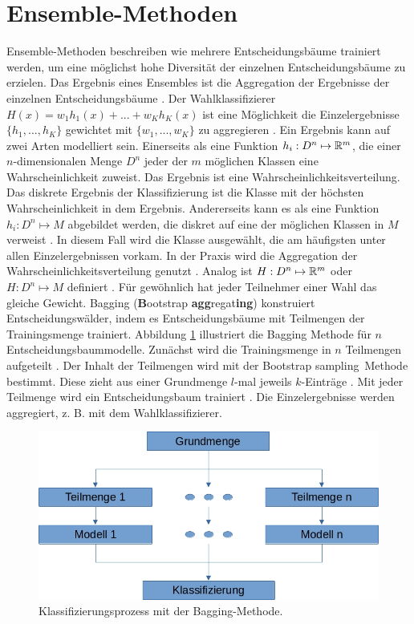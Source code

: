 \section{Ensemble-Methoden}
\label{sec:dt_ensemble_methods}
Ensemble-Methoden beschreiben wie mehrere Entscheidungsbäume trainiert werden, um eine möglichst hohe Diversität der einzelnen Entscheidungsbäume zu erzielen. Das Ergebnis eines Ensembles
ist die Aggregation der Ergebnisse der einzelnen Entscheidungsbäume \cite{dietterich2002ensemble}.
\newline
\newline
Der Wahlklassifizierer $H(x) = w_1 h_1(x) + ... + w_K h_K(x)$ ist eine Möglichkeit die Einzelergebnisse $\{h_1, ..., h_K\}$ gewichtet mit $\{w_1, ..., w_K\}$ zu aggregieren \cite{dietterich2002ensemble}.
Ein Ergebnis kann auf zwei Arten modelliert sein. Einerseits als eine Funktion $h_i: D^n \mapsto {\mathbb R}^m$, die einer $n$-dimensionalen Menge $D^n$ jeder der $m$ möglichen Klassen eine Wahrscheinlichkeit
zuweist. Das Ergebnis ist eine Wahrscheinlichkeitsverteilung. Das diskrete Ergebnis der Klassifizierung ist die Klasse mit der höchsten Wahrscheinlichkeit in dem Ergebnis.
Andererseits kann es als eine Funktion $h_i: D^n \mapsto M$ abgebildet werden, die diskret auf eine der möglichen Klassen in $M$ verweist \cite{dymelThesis}. In diesem Fall wird die Klasse ausgewählt, die am
häufigsten unter allen Einzelergebnissen vorkam. In der Praxis wird die Aggregation der Wahrscheinlichkeitsverteilung genutzt \cite{ScikitLearnEnsemble}.
Analog ist $H: D^n \mapsto {\mathbb R}^m$ oder $H: D^n \mapsto M$ definiert \cite{dietterich2002ensemble}. Für gewöhnlich hat jeder Teilnehmer einer Wahl das gleiche Gewicht.
\newline
\newline
Bagging (\textbf{B}ootstrap \textbf{agg}regat\textbf{ing}) konstruiert Entscheidungswälder, indem es Entscheidungsbäume mit Teilmengen der Trainingsmenge trainiert.
Abbildung \ref{fig:bagging} illustriert die Bagging Methode für $n$ Entscheidungsbaummodelle. Zunächst wird die Trainingsmenge in $n$ Teilmengen aufgeteilt \cite{breiman1996bagging}.
Der Inhalt der Teilmengen wird mit der \glqq Bootstrap sampling\grqq\ Methode bestimmt. Diese zieht aus einer Grundmenge $l$-mal jeweils $k$-Einträge \cite{efron1992bootstrap}.
Mit jeder Teilmenge wird ein Entscheidungsbaum trainiert \cite{breiman1996bagging}. Die Einzelergebnisse werden aggregiert, z. B. mit dem Wahlklassifizierer.
\begin{figure}[h!]
    \centering
    \includegraphics[width=0.6\linewidth]{images/bagging.jpg}
    \caption{Klassifizierungsprozess mit der Bagging-Methode.}
    \label{fig:bagging}
\end{figure}
